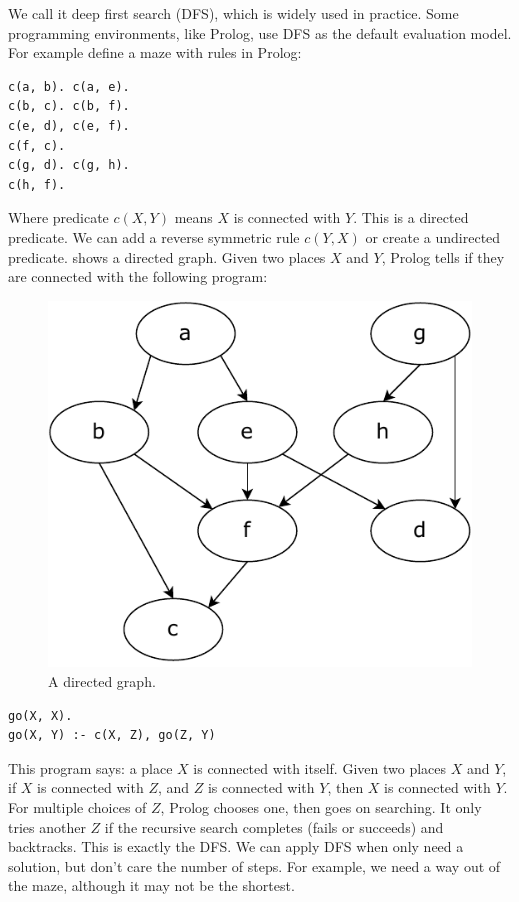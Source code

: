 \documentclass[b5paper]{article}
\begin{document}
We call it deep first search (DFS), which is widely used in practice. Some programming environments, like Prolog, use DFS as the default evaluation model. For example define a maze with rules in Prolog:

\lstset{language=Prolog}
\begin{lstlisting}
c(a, b). c(a, e).
c(b, c). c(b, f).
c(e, d), c(e, f).
c(f, c).
c(g, d). c(g, h).
c(h, f).
\end{lstlisting}

Where predicate $c(X, Y)$ means $X$ is connected with $Y$. This is a directed predicate. We can add a reverse symmetric rule $c(Y, X)$ or create a undirected predicate.  shows a directed graph. Given two places $X$ and $Y$, Prolog tells if they are connected with the following program:

\begin{figure}[htbp]
 \centering
 \includegraphics[scale=0.6]{img/directed-graph}
 \caption{A directed graph.}
 \label{fig:directed-graph}
\end{figure}

\lstset{language=Prolog}
\begin{lstlisting}
go(X, X).
go(X, Y) :- c(X, Z), go(Z, Y)
\end{lstlisting}

This program says: a place $X$ is connected with itself. Given two places $X$ and $Y$, if $X$ is connected with $Z$, and $Z$ is connected with $Y$, then $X$ is connected with $Y$. For multiple choices of $Z$, Prolog chooses one, then goes on searching. It only tries another $Z$ if the recursive search completes (fails or succeeds) and backtracks. This is exactly the DFS. We can apply DFS when only need a solution, but don't care the number of steps. For example, we need a way out of the maze, although it may not be the shortest.
\end{document}

